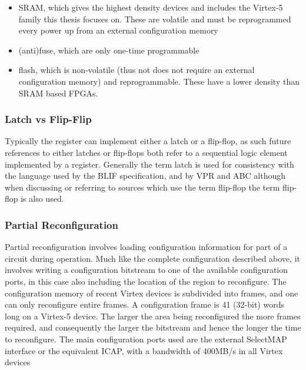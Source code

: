 \documentclass[12pt,final,oneside]{dwThesis} %
\begin{document}
   \begin{itemize}

      \item \gls{SRAM}, which gives the highest density devices and includes
         the Virtex-5 family this thesis focuses on. These are volatile and
         must be reprogrammed every power up from an external configuration
         memory
      \item (anti)fuse, which are only one-time programmable
      \item flash, which is non-volatile (thus not does not require an external
         configuration memory) and reprogrammable. These have a lower
         density than \gls{SRAM} based \glspl{FPGA}\cite{FPGAArch}.

   \end{itemize}
   \subsubsection{Latch vs Flip-Flip}
   Typically the register can implement either a latch or a flip-flop,
   as such future references to either latches or flip-flops both refer to a sequential logic element 
   implemented by a register.
   Generally the term latch is used for consistency with the language used by
   the \gls{BLIF} specification, and by \gls{VPR} and \gls{ABC} although when discussing or referring to sources
   which use the term flip-flop the term flip-flop is also used.
   
   \subsubsection{Partial Reconfiguration} Partial
   reconfiguration involves loading configuration information for part of a
   circuit during operation. Much like the complete configuration described
   above, it involves writing a configuration bitstream to one of the
   available configuration ports, in this case also including the location
   of the region to reconfigure. The configuration memory of recent Virtex
   devices is subdivided into frames, and one can only reconfigure entire
   frames. A configuration frame is 41 (32-bit) words long on a Virtex-5
   device. The larger the area being reconfigured the more frames required,
   and consequently the larger the bitstream and hence the longer the time
   to reconfigure. The main configuration ports used are the external
   SelectMAP interface or the equivalent \gls{ICAP}, with a bandwidth of
   400MB/s in all Virtex devices \cite{XCell33,DiesselChange}
\end{document}
